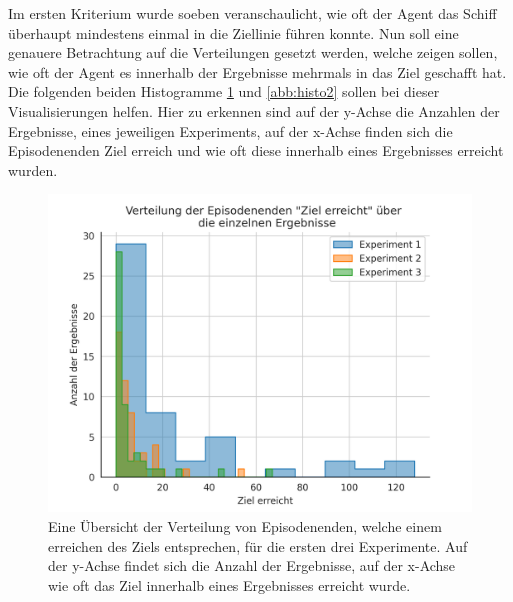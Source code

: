 \documentclass[]{iat}
\begin{document}
Im ersten Kriterium wurde soeben veranschaulicht, wie oft der Agent das Schiff überhaupt mindestens einmal in die Ziellinie führen konnte. Nun soll eine genauere Betrachtung auf die Verteilungen gesetzt werden, welche zeigen sollen, wie oft der Agent es innerhalb der Ergebnisse mehrmals in das Ziel geschafft hat. Die folgenden beiden Histogramme \ref{abb:histo1} und \ref{abb:histo2} sollen bei dieser Visualisierungen helfen. Hier zu erkennen sind auf der y-Achse die Anzahlen der Ergebnisse, eines jeweiligen Experiments, auf der x-Achse finden sich die Episodenenden \glqq Ziel erreich\grqq{} und wie oft diese innerhalb eines Ergebnisses erreicht wurden.

\begin{figure}[H]
    \includegraphics[width=\textwidth]{graphics/goal_reached_histogram_1.png}
    \centering
    \caption{Eine Übersicht der Verteilung von Episodenenden, welche einem erreichen des Ziels entsprechen, für die ersten drei Experimente. Auf der y-Achse findet sich die Anzahl der Ergebnisse, auf der x-Achse wie oft das Ziel innerhalb eines Ergebnisses erreicht wurde.}
    \label{abb:histo1}
\end{figure}
\end{document}
